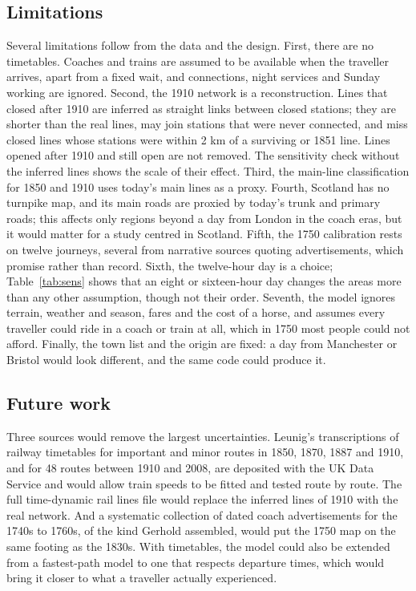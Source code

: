 \subsection{Limitations}
Several limitations follow from the data and the design. First, there are no timetables. Coaches and trains are assumed to be available when the traveller arrives, apart from a fixed wait, and connections, night services and Sunday working are ignored. Second, the 1910 network is a reconstruction. Lines that closed after 1910 are inferred as straight links between closed stations; they are shorter than the real lines, may join stations that were never connected, and miss closed lines whose stations were within 2 km of a surviving or 1851 line. Lines opened after 1910 and still open are not removed. The sensitivity check without the inferred lines shows the scale of their effect. Third, the main-line classification for 1850 and 1910 uses today's main lines as a proxy. Fourth, Scotland has no turnpike map, and its main roads are proxied by today's trunk and primary roads; this affects only regions beyond a day from London in the coach eras, but it would matter for a study centred in Scotland. Fifth, the 1750 calibration rests on twelve journeys, several from narrative sources quoting advertisements, which promise rather than record. Sixth, the twelve-hour day is a choice; Table~\ref{tab:sens} shows that an eight or sixteen-hour day changes the areas more than any other assumption, though not their order. Seventh, the model ignores terrain, weather and season, fares and the cost of a horse, and assumes every traveller could ride in a coach or train at all, which in 1750 most people could not afford. Finally, the town list and the origin are fixed: a day from Manchester or Bristol would look different, and the same code could produce it.

\subsection{Future work}
Three sources would remove the largest uncertainties. Leunig's transcriptions of railway timetables for important and minor routes in 1850, 1870, 1887 and 1910, and for 48 routes between 1910 and 2008, are deposited with the UK Data Service and would allow train speeds to be fitted and tested route by route. The full time-dynamic rail lines file would replace the inferred lines of 1910 with the real network. And a systematic collection of dated coach advertisements for the 1740s to 1760s, of the kind Gerhold assembled, would put the 1750 map on the same footing as the 1830s. With timetables, the model could also be extended from a fastest-path model to one that respects departure times, which would bring it closer to what a traveller actually experienced.
